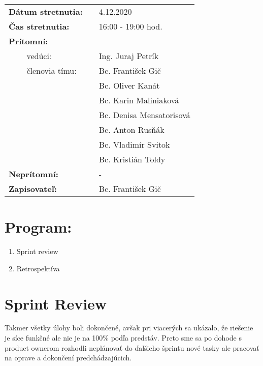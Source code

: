 \documentclass{article}
\begin{document}
    

    \begin{table}[h]
        \begin{tabular}{lllll}
            \multicolumn{3}{l}{\textbf{Dátum stretnutia:}} & & 4.12.2020 \\
            \multicolumn{3}{l}{\textbf{Čas stretnutia:}} & & 16:00 - 19:00 hod. \\
            \multicolumn{3}{l}{\textbf{Prítomní:}} \\
            & & vedúci: & & Ing. Juraj Petrík \\
            & & členovia tímu: & & Bc. František Gič  \\
            & & & & Bc. Oliver Kanát \\
            & & & & Bc. Karin Maliniaková \\
            & & & & Bc. Denisa Mensatorisová \\
            & & & & Bc. Anton Rusňák \\
            & & & & Bc. Vladimír Svitok \\
            & & & & Bc. Kristián Toldy \\
            \multicolumn{3}{l}{\textbf{Neprítomní:}} & & -\\
            \multicolumn{3}{l}{\textbf{Zapisovateľ:}} & & Bc. František Gič \\
        \end{tabular}
        \label{tab:grades}
    \end{table}

    \section*{Program:}
    
    \begin{enumerate}
        \item Sprint review 
        \item Retrospektíva
    \end{enumerate}

    \section*{Sprint Review}

        \textnormal {Takmer všetky úlohy boli dokončené, avšak pri viacerých sa ukázalo, že riešenie je síce funkčné ale nie je na 100\% podľa predstáv. 
        Preto sme sa po dohode s product ownerom rozhodli neplánovať do ďalšieho šprintu nové tasky ale pracovať na oprave a dokončení predchádzajúcich.}
\end{document}
